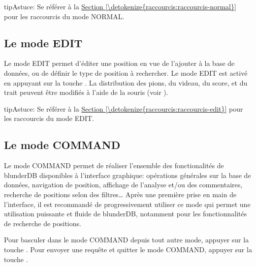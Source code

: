 \documentclass[letterpaper,10pt,french]{sphinxmanual}
\begin{document}
\begin{sphinxadmonition}{tip}{Astuce:}
\sphinxAtStartPar
Se référer à la \hyperref[\detokenize{raccourcis:raccourcis-normal}]{Section \ref{\detokenize{raccourcis:raccourcis-normal}}} pour les raccourcis
du mode NORMAL.
\end{sphinxadmonition}


\subsection{Le mode EDIT}
\label{\detokenize{manuel:le-mode-edit}}\label{\detokenize{manuel:mode-edit}}
\sphinxAtStartPar
Le mode EDIT permet d’éditer une position en vue de l’ajouter à
la base de données, ou de définir le type de position à rechercher.
Le mode EDIT est activé en appuyant sur la touche .
La distribution des pions, du videau, du score, et du trait peuvent être
modifiés à l’aide de la souris (voir {\hyperref[\detokenize{guide_utilisateur:guide-edit-position}]{}}).

\begin{sphinxadmonition}{tip}{Astuce:}
\sphinxAtStartPar
Se référer à la \hyperref[\detokenize{raccourcis:raccourcis-edit}]{Section \ref{\detokenize{raccourcis:raccourcis-edit}}} pour les raccourcis du mode
EDIT.
\end{sphinxadmonition}


\subsection{Le mode COMMAND}
\label{\detokenize{manuel:le-mode-command}}\label{\detokenize{manuel:mode-command}}
\sphinxAtStartPar
Le mode COMMAND permet de réaliser l’ensemble des fonctionalités de blunderDB
disponibles à l’interface graphique: opérations générales sur la base de
données, navigation de position, affichage de l’analyse et/ou des commentaires,
recherche de positions selon des filtres… Après une première prise en main de
l’interface, il est recommandé de progressivement utiliser ce mode qui permet
une utilisation puissante et fluide de blunderDB, notamment pour les
fonctionnalités de recherche de positions.

\sphinxAtStartPar
Pour basculer dans le mode COMMAND depuis tout autre mode, appuyer sur
la touche . Pour envoyer une requête et quitter le mode COMMAND,
appuyer sur la touche .
\end{document}
